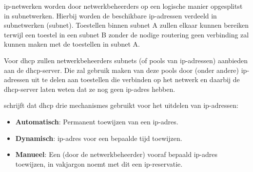 \acrshort{ip}-netwerken worden door netwerkbeheerders op een logische manier opgesplitst in subnetwerken. Hierbij worden de beschikbare \acrshort{ip}-adressen verdeeld in subnetwerken (subnet). Toestellen binnen subnet A zullen elkaar kunnen bereiken terwijl een toestel in een subnet B zonder de nodige routering geen verbinding zal kunnen maken met de toestellen in subnet A.

Voor \acrshort{dhcp} zullen netwerkbeheerders subnets (of pools van \acrshort{ip}-adressen) aanbieden aan de \acrshort{dhcp}-server. Die zal gebruik maken van deze pools door (onder andere) \acrshort{ip}-adressen uit te delen aan toestellen die verbinden op het netwerk en daarbij de \acrshort{dhcp}-server laten weten dat ze nog geen \acrshort{ip}-adres hebben.

\textcite{Droms1997} schrijft dat \acrshort{dhcp} drie mechanismes gebruikt voor het uitdelen van \acrshort{ip}-adressen:
\begin{itemize}
    \item \textbf{Automatisch}: Permanent toewijzen van een \acrshort{ip}-adres.
    \item \textbf{Dynamisch}: \acrshort{ip}-adres voor een bepaalde tijd toewijzen.
    \item \textbf{Manueel}: Een (door de netwerkbeheerder) vooraf bepaald \acrshort{ip}-adres toewijzen, in vakjargon noemt met dit een \acrshort{ip}-reservatie.
\end{itemize}